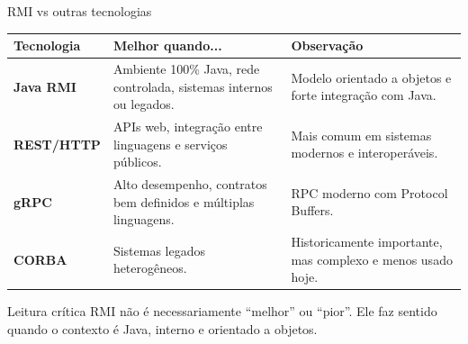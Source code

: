 \documentclass[aspectratio=169]{beamer}
\begin{document}
\begin{frame}{RMI vs outras tecnologias}
    \begin{table}
        \scriptsize
        \renewcommand{\arraystretch}{1.25}
        \begin{tabular}{>{\bfseries}p{2.2cm}p{4.7cm}p{5.3cm}}
            \toprule
            Tecnologia & Melhor quando... & Observação \\
            \midrule
            Java RMI & Ambiente 100\% Java, rede controlada, sistemas internos ou legados. & Modelo orientado a objetos e forte integração com Java. \\
            REST/HTTP & APIs web, integração entre linguagens e serviços públicos. & Mais comum em sistemas modernos e interoperáveis. \\
            gRPC & Alto desempenho, contratos bem definidos e múltiplas linguagens. & RPC moderno com Protocol Buffers. \\
            CORBA & Sistemas legados heterogêneos. & Historicamente importante, mas complexo e menos usado hoje. \\
            \bottomrule
        \end{tabular}
    \end{table}

    \vspace{0.2cm}
    \begin{block}{Leitura crítica}
        RMI não é necessariamente ``melhor'' ou ``pior''. Ele faz sentido quando o contexto é Java, interno e orientado a objetos.
    \end{block}
\end{frame}
\end{document}
